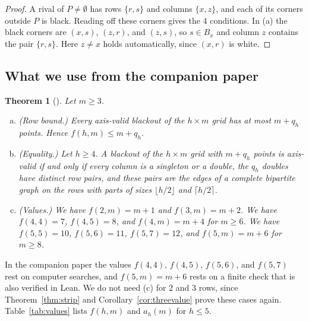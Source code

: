 \documentclass[12pt]{article}
\theoremstyle{plain}
\newtheorem{theorem}{Theorem}
\theoremstyle{definition}
\theoremstyle{remark}
\begin{document}
\begin{proof}
A rival of $P\ne\emptyset$ has rows $\{r,s\}$ and columns $\{x,z\}$, and each of
its corners outside $P$ is black. Reading off these corners gives the $4$
conditions. In (a) the black corners are $(x,s)$, $(z,r)$, and $(z,s)$, so
$s\in B_x$ and column $z$ contains the pair $\{r,s\}$. Here $z\ne x$ holds
automatically, since $(x,r)$ is white.
\end{proof}

\subsection{What we use from the companion paper}

\begin{theorem}[{\cite{pemmasaniExtremal}}]\label{thm:imports}
Let $m\ge3$.
\begin{enumerate}[(a)]
\item \textup{(Row bound.)} Every axis-valid blackout of the $h\times m$ grid has
at most $m+q_h$ points. Hence $f(h,m)\le m+q_h$.
\item \textup{(Equality.)} Let $h\ge4$. A blackout of the $h\times m$ grid with
$m+q_h$ points is axis-valid if and only if every column is a singleton or a
double, the $q_h$ doubles have distinct row pairs, and these pairs are the edges
of a complete bipartite graph on the rows with parts of sizes $\lfloor h/2\rfloor$
and $\lceil h/2\rceil$.
\item \textup{(Values.)} We have $f(2,m)=m+1$ and $f(3,m)=m+2$. We have
$f(4,4)=7$, $f(4,5)=8$, and $f(4,m)=m+4$ for $m\ge6$. We have $f(5,5)=10$,
$f(5,6)=11$, $f(5,7)=12$, and $f(5,m)=m+6$ for $m\ge8$.
\end{enumerate}
\end{theorem}

In the companion paper the values $f(4,4)$, $f(4,5)$, $f(5,6)$, and $f(5,7)$
rest on computer searches, and $f(5,m)=m+6$ rests on a finite check that is
also verified in Lean. We do not need (c) for $2$ and $3$ rows, since
Theorem~\ref{thm:strip} and Corollary~\ref{cor:threevalue} prove these cases
again. Table~\ref{tab:values} lists $f(h,m)$ and $a_h(m)$ for $h\le5$.
\end{document}
